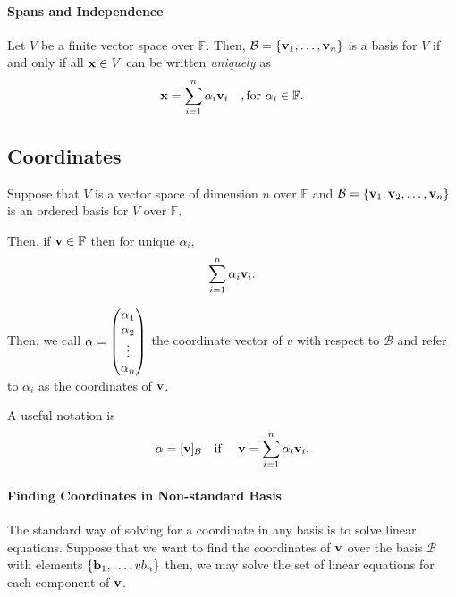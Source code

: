\paragraph{Spans and Independence}
Let \(V\) be a finite vector space over \(\mathbb{F}\).
Then, \(\mathcal{B} = \{\mathbf{v}_1, \dots, \mathbf{v}_n\}\) is a basis for
\(V\) if and only if all \(\mathbf{x} \in V\)
can be written \textit{uniquely} as 
\[
    \mathbf{x} = \sum_{i=1}^{n} \alpha_i \mathbf{v}_i \quad, \text{for } \alpha_i \in \mathbb{F}.
\]

\subsection{Coordinates}
Suppose that \(V\) is a vector space of dimension \(n\) over \(\mathbb{F}\)
and \(\mathcal{B} = \{\mathbf{v}_1, \mathbf{v}_2,\dots, \mathbf{v}_n\}\) is an ordered
basis for \(V\) over \(\mathbb{F}\).

Then, if \(\mathbf{v}\in \mathbb{F}\) then for unique \(\alpha_i\),
\[
    \sum_{i=1}^{n} \alpha_i \mathbf{v}_i.
\]

Then, we call \(\mathbf{\alpha}
    = \begin{pmatrix}
        \alpha_1 \\ \alpha_2 \\ \vdots \\ \alpha_n
    \end{pmatrix}
\) the coordinate vector of \(v\) with respect to \(\mathcal{B}\)
and refer to \(\alpha_i\) as the coordinates of \(\mathbf{v}\).

A useful notation is
\[
    \mathbf{\alpha} = [\mathbf{v}]_\mathcal{B}
    \text{\quad if \quad}
    \mathbf{v} = \sum_{i=1}^{n} \alpha_i \mathbf{v}_i.
\]

\paragraph{Finding Coordinates in Non-standard Basis}
The standard way of solving for a coordinate in any basis is to solve
linear equations.
Suppose that we want to find the coordinates of \(\mathbf{v}\) over the
basis \(\mathcal{B}\) with elements \(\{\mathbf{b}_1, \dots, vb_n\}\)
then, we may solve the set of linear equations for each component of
\(\mathbf{v}\).
